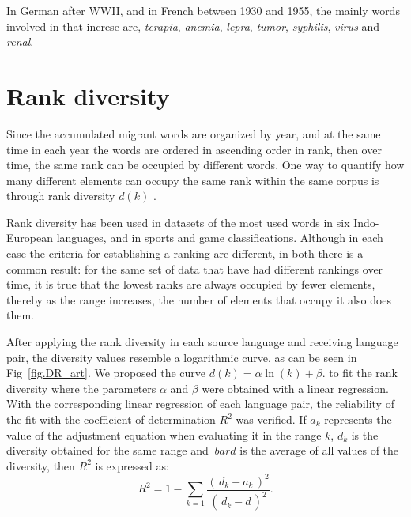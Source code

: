 \documentclass[10pt,letterpaper]{article} %
\begin{document}
In German after WWII, and in French between 1930 and 1955, the mainly words involved in that increse are, \textit{terapia}, \textit{anemia}, \textit{lepra}, \textit{tumor}, \textit{syphilis}, \textit{virus} and \textit{renal}.

\section*{Rank diversity} %

Since the accumulated migrant words are organized by year, and at the same time
in each year the words are ordered in ascending order in rank, then over time,
the same rank can be occupied by different words. One way to quantify how many
different elements can occupy the same rank within the same corpus is through
rank diversity $d(k)$ .

Rank diversity has been used in datasets of the most used words in six
Indo-European languages, and in sports and game classifications. Although in
each case the criteria for establishing a ranking are different, in both there
is a common result: for the same set of data that have had different rankings
over time, it is true that the lowest ranks are always occupied by fewer
elements, thereby as the range increases, the number of elements that occupy it
also does them.

After applying the rank diversity in each source language and receiving language pair, the diversity values resemble a logarithmic curve, as can be seen in Fig~\ref{fig.DR_art}. We proposed the curve $d(k) =  \alpha \ln(k) + \beta.$ to fit the rank diversity where the parameters $\alpha$ and $\beta$ were obtained with a linear regression. With the corresponding linear regression of each language pair, the reliability of the fit with the coefficient of determination $R^{2}$ was verified. If $ a_ {k} $ represents the value of the adjustment equation when evaluating it in the range $ k $, $ d_ {k} $ is the diversity obtained for the same range and $ \ bar {d} $ is the average of all values of the diversity, then $R^{2}$ is expressed as:
\begin{equation}
R^{2} = 1 - \sum_{k = 1} \frac{ \left( \,d_{k} - a_{k} \,\right)^{2}  }{ \left( \, d_{k} - \bar{d} \,\right)^{2} }.	
\label{ec.r2_diversidad}
\end{equation}
\end{document}
